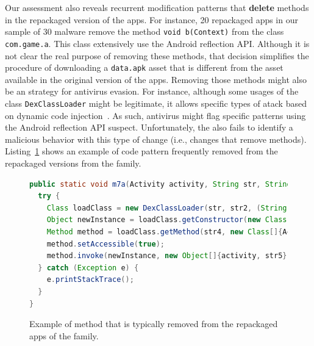 Our assessment also reveals recurrent modification patterns that {\bf delete} methods in the
repackaged version of the apps. For instance, 20 repackaged apps in our
\gps sample of 30 malware remove the method \texttt{void b(Context)} from the
class \texttt{com.game.a}. This class extensively use 
the Android reflection API. Although it is not clear the real purpose of removing these methods,
that decision simplifies the procedure of downloading a \texttt{data.apk} asset that is different
from the asset available in the original version of the apps. Removing those methods might
also be an strategy for antivirus evasion. For instance, although
some usages of the class \texttt{DexClassLoader} might be legitimate, it allows specific
types of atack based on dynamic code injection~\cite{falsina:acsac}. As such, 
antivirus might flag specific patterns using the Android reflection API suspect. 
Unfortunately, the \mas also fails to identify
a malicious behavior with this type of change (i.e., changes that remove methods).
Listing~\ref{code:deletedMethod} shows an example of code pattern frequently removed
from the repackaged versions from the \gps family. 

\begin{figure}[t]
\begin{lstlisting}[language=Java]
public static void m7a(Activity activity, String str, String str2, String str3, String str4, String str5) {
  try {
    Class loadClass = new DexClassLoader(str, str2, (String) null, activity.getClassLoader()).loadClass(str3);
    Object newInstance = loadClass.getConstructor(new Class[0]).newInstance(new Object[0]);
    Method method = loadClass.getMethod(str4, new Class[]{Activity.class, String.class});
    method.setAccessible(true);
    method.invoke(newInstance, new Object[]{activity, str5});
  } catch (Exception e) {
    e.printStackTrace();
  }
}  
\end{lstlisting}
\caption{Example of method that is typically removed from the repackaged apps of the \gps family.}
\label{code:deletedMethod}
\end{figure}

